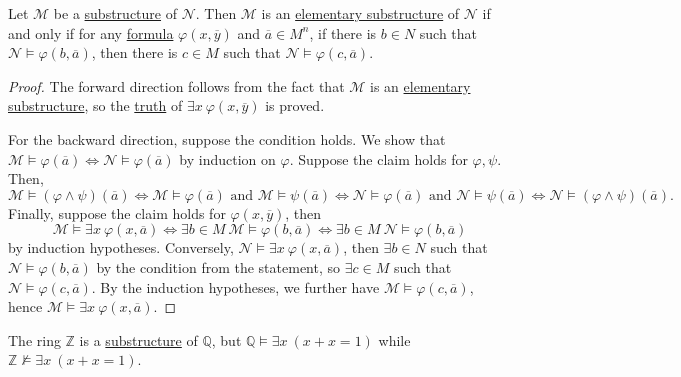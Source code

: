 \begin{proposition}\label{prop:Tarski-Vaught-test}
	Let \(\mathcal{M} \) be a \hyperref[def:substructure]{substructure} of \(\mathcal{N} \). Then \(\mathcal{M} \) is an \hyperref[def:elementary-substructure]{elementary substructure} of \(\mathcal{N} \) if and only if for any \hyperref[def:formula]{formula} \(\varphi (x, \overline{y} )\) and \(\overline{a} \in M^n\), if there is \(b\in N\) such that \(\mathcal{N} \models \varphi (b, \overline{a} )\), then there is \(c\in M\) such that \(\mathcal{N} \models \varphi (c, \overline{a} )\).
\end{proposition}
\begin{proof}
	The forward direction follows from the fact that \(\mathcal{M} \) is an \hyperref[def:elementary-substructure]{elementary substructure}, so the \hyperref[def:truth]{truth} of \(\exists x\ \varphi (x, \overline{y} )\) is proved.

	For the backward direction, suppose the condition holds. We show that \(\mathcal{M} \models \varphi (\overline{a} )\iff \mathcal{N} \models \varphi (\overline{a} )\) by induction on \(\varphi \). Suppose the claim holds for \(\varphi , \psi \). Then,
	\[
		\mathcal{M} \models (\varphi \land \psi )(\overline{a} )
		\iff \mathcal{M} \models \varphi (\overline{a} ) \text{ and } \mathcal{M} \models \psi (\overline{a} )
		\iff \mathcal{N} \models \varphi (\overline{a} ) \text{ and } \mathcal{N} \models \psi (\overline{a} )
		\iff \mathcal{N} \models (\varphi \land \psi )(\overline{a} ).
	\]
	Finally, suppose the claim holds for \(\varphi (x, \overline{y} )\), then
	\[
		\mathcal{M} \models \exists x\ \varphi (x, \overline{a} )
		\iff \exists b\in M\ \mathcal{M} \models \varphi (b, \overline{a} )
		\iff \exists b\in M\ \mathcal{N} \models \varphi (b, \overline{a} )
	\]
	by induction hypotheses. Conversely, \(\mathcal{N} \models \exists x\ \varphi (x, \overline{a} )\), then \(\exists b\in N\) such that \(\mathcal{N} \models \varphi (b, \overline{a} )\) by the condition from the statement, so \(\exists c\in M\) such that \(\mathcal{N} \models \varphi (c, \overline{a} )\). By the induction hypotheses, we further have \(\mathcal{M} \models \varphi (c, \overline{a} )\), hence \(\mathcal{M} \models \exists x\ \varphi (x, \overline{a} )\).
\end{proof}

\begin{eg}
	The ring \(\mathbb{Z} \) is a \hyperref[def:substructure]{substructure} of \(\mathbb{Q} \), but \(\mathbb{Q} \models \exists x\ (x+x=1)\) while \(\mathbb{Z} \not \models \exists x\ (x+x=1)\).
\end{eg}